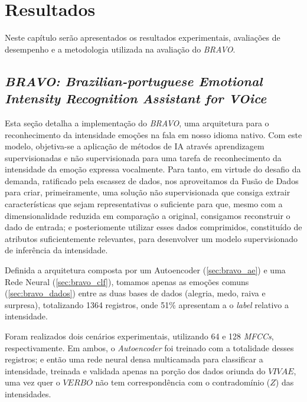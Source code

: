\chapter{Resultados}\label{Cap:Resultados}

Neste capítulo serão apresentados os resultados experimentais, avaliações de desempenho e a metodologia utilizada na avaliação do \textit{BRAVO}.\\

\section{\textit{BRAVO: \textbf{B}razilian-portuguese Emotional Intensity \textbf{R}ecognition \textbf{A}ssistant for \textbf{VO}ice}}\label{sec:implementacao}

Esta seção detalha a implementação do \textit{BRAVO}, uma arquitetura para o reconhecimento da intensidade emoções na fala em nosso idioma nativo. Com este modelo, objetiva-se a aplicação de métodos de IA através aprendizagem supervisionadas e não supervisionada para uma tarefa de reconhecimento da intensidade da emoção expressa vocalmente. Para tanto, em virtude do desafio da demanda, ratificado pela escassez de dados, nos aproveitamos da Fusão de Dados  para criar, primeiramente, uma solução não supervisionada que consiga extrair características que sejam representativas o suficiente para que, mesmo com a dimensionalidade reduzida em comparação a original, consigamos reconstruir o dado de entrada; e posteriomente utilizar esses dados comprimidos, constituído de atributos suficientemente relevantes, para desenvolver um modelo supervisionado de inferência da intensidade.

Definida a arquitetura composta por um Autoencoder (\ref{sec:bravo_ae}) e uma Rede Neural (\ref{sec:bravo_clf}), tomamos apenas as emoções comuns (\ref{sec:bravo_dados}) entre as duas bases de dados (alegria, medo, raiva e surpresa), totalizando 1364 registros, onde 51\% apresentam a o \textit{label} relativo a intensidade. %


Foram realizados dois cenários experimentais, utilizando 64 e 128 \textit{MFCCs}, respectivamente. Em ambos,  o \textit{Autoencoder} foi treinado com a totalidade desses registros; e então uma rede neural densa multicamada para classificar a intensidade, treinada e validada apenas na porção dos dados oriunda do $VIVAE$, uma vez quer o $VERBO$ não tem correspondência com o contradomínio ($Z$) das intensidades.

